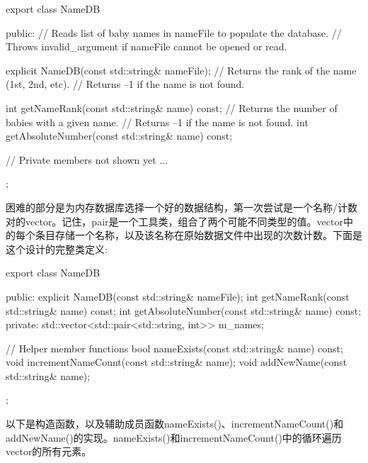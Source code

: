 \begin{cpp}
export class NameDB
{
    public:
        // Reads list of baby names in nameFile to populate the database.
        // Throws invalid_argument if nameFile cannot be opened or read.

        explicit NameDB(const std::string& nameFile);
        // Returns the rank of the name (1st, 2nd, etc).
        // Returns –1 if the name is not found.

        int getNameRank(const std::string& name) const;
        // Returns the number of babies with a given name.
        // Returns –1 if the name is not found.
        int getAbsoluteNumber(const std::string& name) const;

        // Private members not shown yet ...
};
\end{cpp}

困难的部分是为内存数据库选择一个好的数据结构，第一次尝试是一个名称/计数对的vector。记住，pair是一个工具类，组合了两个可能不同类型的值。vector中的每个条目存储一个名称，以及该名称在原始数据文件中出现的次数计数。下面是这个设计的完整类定义:

\begin{cpp}
export class NameDB
{
    public:
        explicit NameDB(const std::string& nameFile);
        int getNameRank(const std::string& name) const;
        int getAbsoluteNumber(const std::string& name) const;
    private:
        std::vector<std::pair<std::string, int>> m_names;

        // Helper member functions
        bool nameExists(const std::string& name) const;
        void incrementNameCount(const std::string& name);
        void addNewName(const std::string& name);
};
\end{cpp}

以下是构造函数，以及辅助成员函数nameExists()、incrementNameCount()和addNewName()的实现。nameExists()和incrementNameCount()中的循环遍历vector的所有元素。

